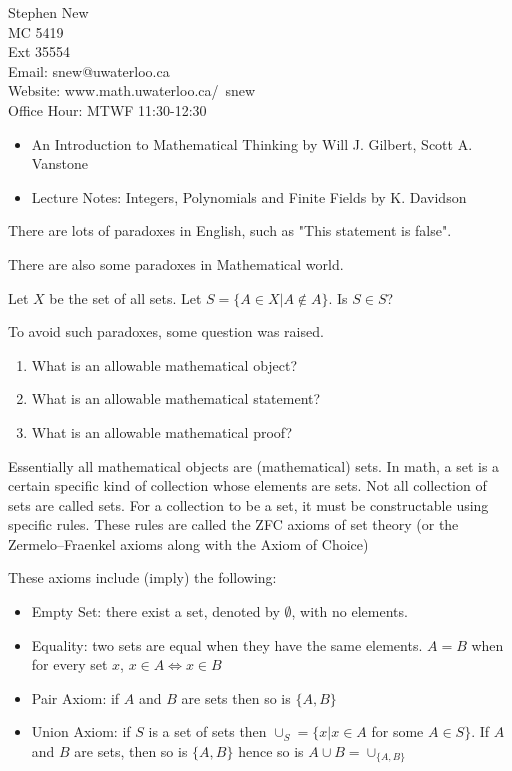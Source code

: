 

Stephen New\\
MC 5419\\
Ext 35554\\
Email: snew@uwaterloo.ca\\
Website: www.math.uwaterloo.ca/~snew\\
Office Hour: MTWF 11:30-12:30
\begin{itemize}
\item An Introduction to Mathematical Thinking by Will J. Gilbert, Scott A. Vanstone
\item Lecture Notes: Integers, Polynomials and Finite Fields by K. Davidson
\end{itemize}



There are lots of paradoxes in English, such as "This statement is false". 

There are also some paradoxes in Mathematical world.




Let $X$ be the set of all sets. Let $S=\{A\in X| A\notin A\}$. Is $S \in S$?

To avoid such paradoxes, some question was raised.
\begin{enumerate}
    \item What is an allowable mathematical object?
	\item What is an allowable mathematical statement?
    \item What is an allowable mathematical proof?
\end{enumerate}

Essentially all mathematical objects are (mathematical) sets. In math, a set is a certain specific kind of collection whose elements are sets. Not all collection of sets are called sets. For a collection to be a set, it must be constructable using specific rules. These rules are called the ZFC axioms of set theory (or the Zermelo–Fraenkel axioms along with the Axiom of Choice)

These axioms include (imply) the following:
\begin{itemize}
    \item Empty Set: there exist a set, denoted by $\emptyset$, with no elements.
    \item Equality: two sets are equal when they have the same elements. $A = B$ when for every set $x$, $x\in A \iff x\in B$
    \item Pair Axiom: if $A$ and $B$ are sets then so is $\{A,B\}$
    \item Union Axiom: if $S$ is a set of sets then $\cup_{S} = \{x|x\in A$ for some $A\in S\} $. If $A$ and $B$ are sets, then so is $\{A,B\}$ hence so is $A\cup B = \cup_{\{A,B\}}$
    
\end{itemize}

